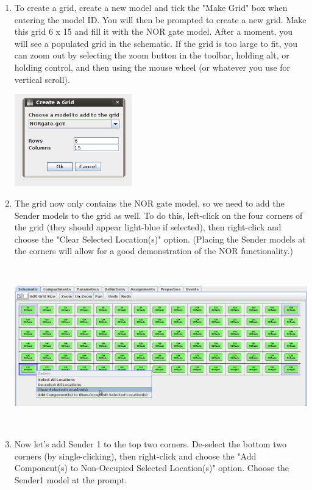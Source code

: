 \documentclass[titlepage,11pt]{article}
\begin{document}
\begin{enumerate}

\item To create a grid, create a new model and tick the "Make Grid" box when entering the model ID.  You will then be prompted to create a new grid.  Make this grid 6 x 15 and fill it with the NOR gate model.  After a moment, you will see a populated grid in the schematic.  If the grid is too large to fit, you can zoom out by selecting the zoom button in the toolbar, holding alt, or holding control, and then using the mouse wheel (or whatever you use for vertical scroll).  

\includegraphics[height=40mm]{screenshots/create_grid}

\item The grid now only contains the NOR gate model, so we need to add the Sender models to the grid as well.  To do this, left-click on the four corners of the grid (they should appear light-blue if selected), then right-click and choose the "Clear Selected Location(s)" option.  (Placing the Sender models at the corners will allow for a good demonstration of the NOR functionality.)

\includegraphics[height=70mm]{screenshots/clear_locations}

\item Now let's add Sender 1 to the top two corners.  De-select the bottom two corners (by single-clicking), then right-click and choose the "Add Component(s) to Non-Occupied Selected Location(s)" option.  Choose the Sender1 model at the prompt.


\end{enumerate}
\end{document}
